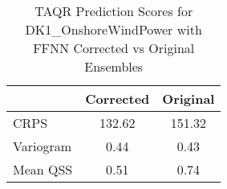 
    \begin{table}[h!]
    \centering
    \begin{tabular}{|l|c|c|}
    \hline
    \textbf{} & \textbf{Corrected} & \textbf{Original} \\ \hline
    CRPS       & 132.62       & 151.32      \\ \hline
    Variogram  & 0.44  & 0.43 \\ \hline
    Mean QSS   & 0.51        & 0.74       \\ \hline
    \end{tabular}
    \caption{TAQR Prediction Scores for DK1_OnshoreWindPower with FFNN Corrected vs Original Ensembles}
    \label{tab:comparison}
    \end{table}
    